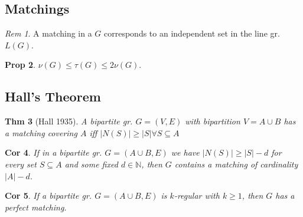 \documentclass[11pt, fleqn, a4paper, landscape]{article}
\theoremstyle{plain} %
\newtheorem{thm}{Thm}
\newtheorem{pro}[thm]{Prop}
\newtheorem{cor}[thm]{Cor}
\theoremstyle{remark} %
\newtheorem{rem}[thm]{Rem}
\theoremstyle{definition} %
\newtheorem{defi}[thm]{Def}
\begin{document}
\begin{multicols}{5}
\section{Matchings}
%
%
%
%
\addtocounter{thm}{2}
\begin{rem}
A matching in a $G$ corresponds to an independent set in the line gr. $L(G)$.
\end{rem}
%
%
%
\addtocounter{thm}{2}
\begin{pro}
$\nu(G) \le\tau(G) \le 2\nu(G).$
\end{pro}
\addtocounter{subsection}{1}
\subsection{Hall’s Theorem}
\begin{thm}[Hall 1935]
A bipartite gr. $G = (V,E)$ with bipartition $V = A\cup B$ has a matching
covering $A$ iff $|N(S)|\ge|S|\forall S \subseteq A$
\end{thm}

\begin{cor}
 If in a bipartite gr. $G = (A\cup B,E)$ we have $|N(S)|\ge|S|-d$ for every set $S \subseteq A$ and some fixed $d\in\mathbb{N}$, then $G$ contains a matching of cardinality $|A|- d$.
\end{cor}

\begin{cor}
If a bipartite gr. $G = (A \cup B,E) $ is $k$-regular with $k \ge 1$, then $G$ has a perfect matching.
\end{cor}


\end{multicols}
\end{document}
